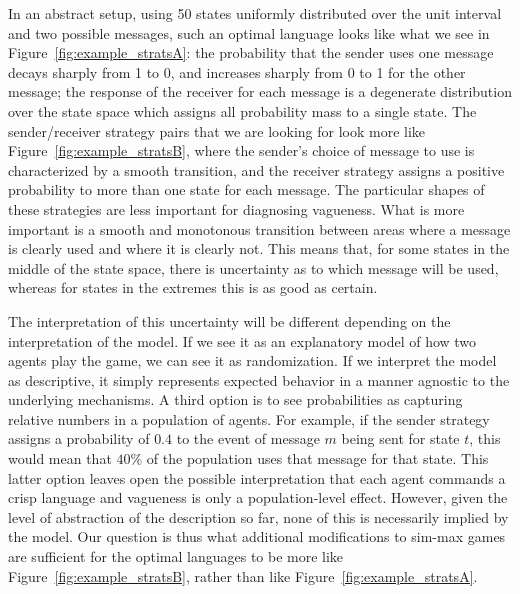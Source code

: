 \documentclass[a4paper]{article}
\begin{document}
In an abstract setup, using 50 states uniformly distributed over the unit interval and two possible messages, such an optimal language looks like what we see in Figure~\ref{fig:example_stratsA}: the probability that the sender uses one message decays sharply from 1 to 0, and increases sharply from 0 to 1 for the other message; the response of the receiver for each message is a degenerate distribution over the state space which assigns all probability mass to a single state.
The sender/receiver strategy pairs that we are looking for look more like Figure~\ref{fig:example_stratsB}, where the sender's choice of message to use is characterized by a smooth transition, and the receiver strategy assigns a positive probability to more than one state for each message.
The particular shapes of these strategies are less important for diagnosing vagueness.
What is more important is a smooth and monotonous transition between areas where a message is clearly used and where it is clearly not.
This means that, for some states in the middle of the state space, there is uncertainty as to which message will be used, whereas for states in the extremes this is as good as certain.

The interpretation of this uncertainty will be different depending on the interpretation of the model.
If we see it as an explanatory model of how two agents play the game, we can see it as randomization.
If we interpret the model as descriptive, it simply represents expected behavior in a manner agnostic to the underlying mechanisms.
A third option is to see probabilities as capturing relative numbers in a population of agents.
For example, if the sender strategy assigns a probability of $0.4$ to the event of message $m$ being sent for state $t$, this would mean that $40\%$ of the population uses that message for that state.
This latter option leaves open the possible interpretation that each agent commands a crisp language and vagueness is only a population-level effect.
However, given the level of abstraction of the description so far, none of this is necessarily implied by the model.
Our question is thus what additional modifications to sim-max games are sufficient for the optimal languages to be more like Figure~\ref{fig:example_stratsB}, rather than like Figure~\ref{fig:example_stratsA}.
\end{document}
